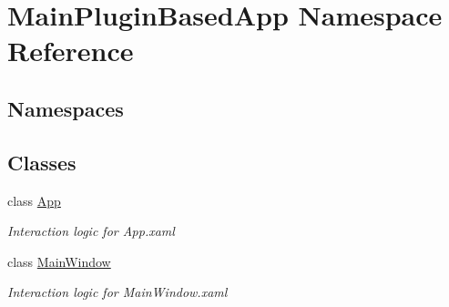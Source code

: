 \hypertarget{namespace_main_plugin_based_app}{}\section{Main\+Plugin\+Based\+App Namespace Reference}
\label{namespace_main_plugin_based_app}
\subsection*{Namespaces}
\begin{DoxyCompactItemize}
\end{DoxyCompactItemize}
\subsection*{Classes}
\begin{DoxyCompactItemize}
\item 
class \mbox{\hyperlink{class_main_plugin_based_app_1_1_app}{App}}
\begin{DoxyCompactList}\small\item\em Interaction logic for App.\+xaml \end{DoxyCompactList}\item 
class \mbox{\hyperlink{class_main_plugin_based_app_1_1_main_window}{Main\+Window}}
\begin{DoxyCompactList}\small\item\em Interaction logic for Main\+Window.\+xaml \end{DoxyCompactList}\end{DoxyCompactItemize}
